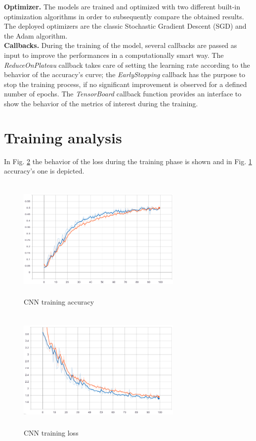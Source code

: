 \textbf{Optimizer.} The models are trained and optimized with two different built-in optimization algorithms in order to subsequently compare the obtained results. The deployed optimizers are the classic Stochastic Gradient Descent (SGD) and the Adam algorithm. \\
\textbf{Callbacks.} During the training of the model, several callbacks are passed as input to improve the performances in a computationally smart way. The {\it{ReduceOnPlateau}} callback takes care of setting the learning rate according to the behavior of the accuracy's curve; the {\it{EarlyStopping}} callback has the purpose to stop the training process, if no significant improvement is observed for a defined number of epochs. The {\it{TensorBoard}} callback function provides an interface to show the behavior of the metrics of interest during the training.

\section{Training analysis}
In Fig. \ref{fig:CNN_loss} the behavior of the loss during the training phase is shown and in Fig.  \ref{fig:CNN_accuracy} accuracy's one is depicted.

\begin{figure}[h]
			\centering
	    	\includegraphics[width=8cm, height=6cm]{debug_tuy_acc}
	    	\caption{CNN training accuracy}
	    	\label{fig:CNN_accuracy}
\end{figure} 

\begin{figure}[h]
			\centering
	    	\includegraphics[width=8cm, height=6cm]{debug_tuy_loss}
	    	\caption{CNN training loss}
	    	\label{fig:CNN_loss}
\end{figure} 



